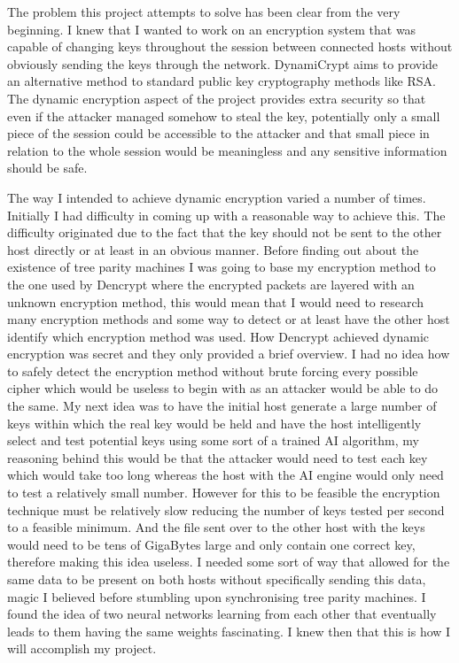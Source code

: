 The problem this project attempts to solve has been clear from the very beginning. I knew that I wanted to work on an encryption system that was capable of changing keys throughout the session between connected hosts without obviously sending the keys through the network. DynamiCrypt aims to provide an alternative method to standard public key cryptography methods like RSA. The dynamic encryption aspect of the project provides extra security so that even if the attacker managed somehow to steal the key, potentially only a small piece of the session could be accessible to the attacker and that small piece in relation to the whole session would be meaningless and any sensitive information should be safe.

The way I intended to achieve dynamic encryption varied a number of times. Initially I had difficulty in coming up with a reasonable way to achieve this. The difficulty originated due to the fact that the key should not be sent to the other host directly or at least in an obvious manner. Before finding out about the existence of tree parity machines I was going to base my encryption method to the one used by Dencrypt where the encrypted packets are layered with an unknown encryption method, this would mean that I would need to research many encryption methods and some way to detect or at least have the other host identify which encryption method was used. How Dencrypt achieved dynamic encryption was secret and they only provided a brief overview. I had no idea how to safely detect the encryption method without brute forcing every possible cipher which would be useless to begin with as an attacker would be able to do the same. My next idea was to have the initial host generate a large number of keys within which the real key would be held and have the host intelligently select and test potential keys using some sort of a trained AI algorithm, my reasoning behind this would be that the attacker would need to test each key which would take too long whereas the host with the AI engine would only need to test a relatively small number. However for this to be feasible the encryption technique must be relatively slow reducing the number of keys tested per second to a feasible minimum. And the file sent over to the other host with the keys would need to be tens of GigaBytes large and only contain one correct key, therefore making this idea useless. I needed some sort of way that allowed for the same data to be present on both hosts without specifically sending this data, magic I believed before stumbling upon synchronising tree parity machines. I found the idea of two neural networks learning from each other that eventually leads to them having the same weights fascinating. I knew then that this is how I will accomplish my project. 

